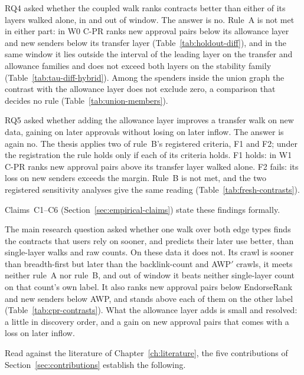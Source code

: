RQ4 asked whether the coupled walk ranks contracts better than either of its layers walked alone, in and out of window. The answer is no. Rule~A is not met in either part: in W0 \mbox{C-PR} ranks new approval pairs below its allowance layer and new senders below its transfer layer (Table~\ref{tab:holdout-diff}), and in the same window it lies outside the interval of the leading layer on the transfer and allowance families and does not exceed both layers on the stability family (Table~\ref{tab:tau-diff-hybrid}). Among the spenders inside the union graph the contrast with the allowance layer does not exclude zero, a comparison that decides no rule (Table~\ref{tab:union-members}).

RQ5 asked whether adding the allowance layer improves a transfer walk on new data, gaining on later approvals without losing on later inflow. The answer is again no. The thesis applies two of rule~B's registered criteria, F1 and F2; under the registration the rule holds only if each of its criteria holds. F1 holds: in W1 \mbox{C-PR} ranks new approval pairs above its transfer layer walked alone. F2 fails: its loss on new senders exceeds the margin. Rule~B is not met, and the two registered sensitivity analyses give the same reading (Table~\ref{tab:fresh-contrasts}).

Claims~C1--C6 (Section~\ref{sec:empirical-claims}) state these findings formally.

The main research question asked whether one walk over both edge types finds the contracts that users rely on sooner, and predicts their later use better, than single-layer walks and raw counts. On these data it does not. Its crawl is sooner than breadth-first but later than the backlink-count and AWP$'$ crawls, it meets neither rule~A nor rule~B, and out of window it beats neither single-layer count on that count's own label. It also ranks new approval pairs below EndorseRank and new senders below AWP, and stands above each of them on the other label (Table~\ref{tab:cpr-contrasts}). What the allowance layer adds is small and resolved: a little in discovery order, and a gain on new approval pairs that comes with a loss on later inflow.


Read against the literature of Chapter~\ref{ch:literature}, the five contributions of Section~\ref{sec:contributions} establish the following.

